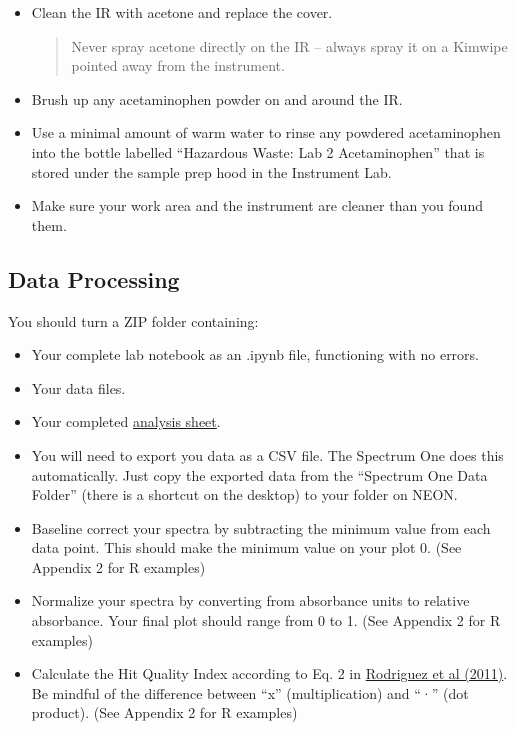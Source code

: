 \documentclass[]{tufte-book}
\providecommand{\tightlist}{%
  \setlength{\itemsep}{0pt}\setlength{\parskip}{0pt}}
\begin{document}
\begin{itemize}
\item
  Clean the IR with acetone and replace the cover.

  \begin{quote}
  Never spray acetone directly on the IR -- always spray it on a Kimwipe pointed away from the instrument.
  \end{quote}
\item
  Brush up any acetaminophen powder on and around the IR.
\item
  Use a minimal amount of warm water to rinse any powdered acetaminophen into the bottle labelled ``Hazardous Waste: Lab 2 Acetaminophen'' that is stored under the sample prep hood in the Instrument Lab.
\item
  Make sure your work area and the instrument are cleaner than you found them.
\end{itemize}

\hypertarget{data-processing-6}{%
\subsection{Data Processing}\label{data-processing-6}}

\begin{marginfigure}
You should turn a ZIP folder containing:

\begin{itemize}
\tightlist
\item
  Your complete lab notebook as an .ipynb file, functioning with no
  errors.\\
\item
  Your data files.\\
\item
  Your completed
  \href{https://github.com/alphonse/alphonse.github.io/raw/master/chem370/assignments/excel-templates/rotation_ftir_data-analysis.xlsx}{analysis
  sheet}.
\end{itemize}
\end{marginfigure}

\begin{itemize}
\tightlist
\item
  You will need to export you data as a CSV file. The Spectrum One does this automatically. Just copy the exported data from the ``Spectrum One Data Folder'' (there is a shortcut on the desktop) to your folder on NEON.
\item
  Baseline correct your spectra by subtracting the minimum value from each data point. This should make the minimum value on your plot 0. (See Appendix 2 for R examples)
\item
  Normalize your spectra by converting from absorbance units to relative absorbance. Your final plot should range from 0 to 1. (See Appendix 2 for R examples)
\item
  Calculate the Hit Quality Index according to Eq. 2 in \href{https://www.researchgate.net/publication/51602215_Standardization_of_Raman_spectra_for_transfer_of_spectral_libraries_across_different_instruments}{Rodriguez et al (2011)}. Be mindful of the difference between ``x'' (multiplication) and ``·'' (dot product). (See Appendix 2 for R examples)
\end{itemize}
\end{document}
